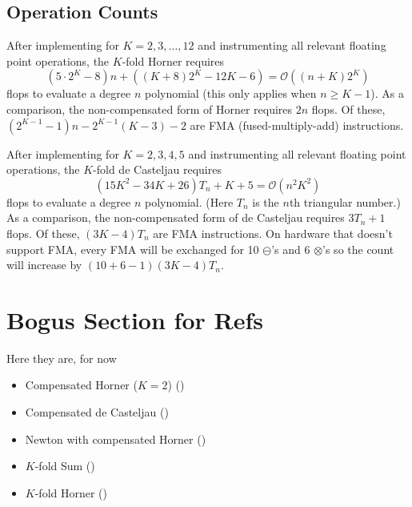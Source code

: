 \documentclass[letterpaper,10pt]{article}
\begin{document}
\subsection{Operation Counts}

After implementing for \(K = 2, 3, \ldots, 12\) and instrumenting all
relevant floating point operations, the \(K\)-fold Horner requires
\[(5 \cdot 2^K - 8)n + \left((K + 8) 2^K - 12K - 6\right) =
\mathcal{O}\left((n + K)2^K\right)\]
flops to evaluate a degree \(n\) polynomial (this only applies when
\(n \geq K - 1\)). As a comparison, the
non-compensated form of Horner requires \(2n\) flops. Of these,
\(\left(2^{K - 1} - 1\right)n - 2^{K - 1}(K - 3) - 2\) are
FMA (fused-multiply-add) instructions.

After implementing for \(K = 2, 3, 4, 5\) and instrumenting all relevant
floating point operations, the \(K\)-fold de Casteljau requires
\[(15K^2 - 34K + 26)T_n + K + 5 =
\mathcal{O}\left(n^2 K^2\right)\]
flops to evaluate a degree \(n\) polynomial. (Here \(T_n\) is the
\(n\)th triangular number.) As a comparison, the non-compensated form of
de Casteljau requires \(3 T_n + 1\) flops. Of these, \((3K - 4)T_n\) are
FMA instructions. On hardware that doesn't support FMA,
every FMA will be exchanged for 10 \(\ominus\)'s and 6 \(\otimes\)'s so the
count will increase by \((10 + 6 - 1)(3K - 4)T_n\).

\section{Bogus Section for Refs}

Here they are, for now
\begin{itemize}
  \item Compensated Horner (\(K = 2\)) (\cite{langlois_et_al:DSP:2006:442})
  \item Compensated de Casteljau (\cite{Jiang2010})
  \item Newton with compensated Horner (\cite{Graillat2008})
  \item \(K\)-fold Sum (\cite{Ogita2005})
  \item \(K\)-fold Horner (\cite{Graillat2009})
\end{itemize}



\end{document}
